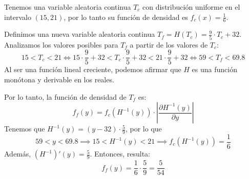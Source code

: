 \documentclass[11pt]{article}
\begin{document}
Tenemos una variable aleatoria continua $T_c$ con distribuci\'on uniforme en el intervalo $(15,21)$, por lo tanto su funci\'on de densidad es $f_c(x) = \frac{1}{6}$.

Definimos una nueva variable aleatoria continua $T_f = H(T_c) = \frac{9}{5} \cdot T_c + 32$. Analizamos los valores posibles para $T_f$ a partir de los valores de $T_c$: 
$$15 < T_c < 21 \iff 15 \cdot \frac{9}{5} + 32 < T_c \cdot \frac{9}{5} + 32 < 21 \cdot \frac{9}{5} + 32 \iff 59 < T_f < 69.8$$ 
Al ser una funci\'on lineal creciente, podemos afirmar que $H$ es una funci\'on mon\'otona y derivable en los reales. 

Por lo tanto, la funci\'on de densidad de $T_f$ es: $$f_f(y) = f_c(H^{-1}(y)) \cdot \left|\frac{\partial H^{-1}(y)}{\partial y}\right|$$
Tenemos que $H^{-1}(y) = (y - 32) \cdot \frac{5}{9}$, por lo que $$59 < y < 69.8 \implies 15 < H^{-1}(y) < 21 \implies f_c(H^{-1}(y)) = \frac{1}{6}$$
Adem\'as, $(H^{-1})'(y) = \frac{5}{9}$. Entonces, resulta: 
$$f_f(y) = \frac{1}{6} \cdot \frac{5}{9} = \frac{5}{54}$$
\end{document}
